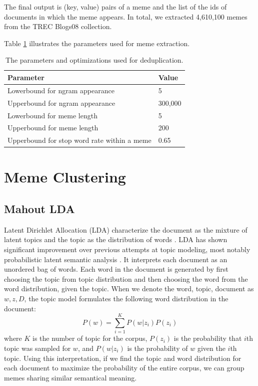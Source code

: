 \documentclass{sig-alternate}
\begin{document}
The final output is (key, value) pairs of a meme and the list of the ids of documents in which the meme appears. In total, we extracted 4,610,100 memes from the TREC Blogs08 collection.

Table \ref{table:memeext} illustrates the parameters used for meme extraction.

\begin{table}[h!t!]
\begin{center}
\begin{tabular}{l|l}

\hline
\textbf{Parameter} & \textbf{Value}\\

\hline
Lowerbound for ngram appearance & 5\\
\hline
Upperbound for ngram appearance & 300,000\\
\hline
Lowerbound for meme length & 5\\
\hline
Upperbound for meme length & 200\\

\hline
Upperbound for stop word rate within a meme & 0.65\\

\hline
\end{tabular}
\caption{The parameters and optimizations used for deduplication.}
\label{table:memeext}
\end{center}
\end{table}

\section{Meme Clustering}

\subsection{Mahout LDA}
Latent Dirichlet Allocation (LDA) characterize the document as the mixture of latent topics and the topic as the distribution of words \cite{Blei2003a}. LDA has shown significant improvement over previous attempts at topic modeling, most notably probabilistic latent semantic analysis \cite{Hofmann1999}. It interprets each document as an unordered bag of words. Each word in the document is generated by first choosing the topic from topic distribution and then choosing the word from the word distribution, given the topic. When we denote the word, topic, document as $w, z, D$, the topic model formulates the following word distribution in the document:
\begin{displaymath}
 P(w)=\sum_{i=1}^K P(w|z_i)P(z_i)
\end{displaymath}
where $K$ is the number of topic for the corpus, $P(z_i)$ is the probability that $i$th topic was sampled for $w$, and $P(w|z_i)$ is the probability of $w$ given the $i$th topic. Using this interpretation, if we find the topic and word distribution for each document to maximize the probability of the entire corpus, we can group memes sharing similar semantical meaning.
\end{document}
